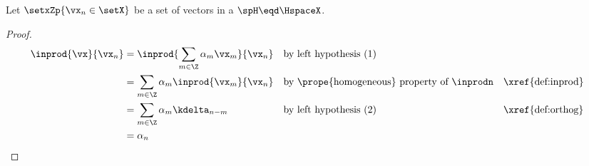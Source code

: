 \begin{lemma}
\label{lem:Hfex}
Let $\setxZp{\vx_n\in\setX}$ be a set of vectors in a   $\spH\eqd\HspaceX$.
\end{lemma}
\begin{proof}
  \begin{align*}
    \inprod{\vx}{\vx_n}
      &= \inprod{\sum_{m\in\Z} \alpha_m \vx_m}{\vx_n}
      && \text{by left hypothesis (1)}
    \\&= \sum_{m\in\Z} \alpha_m \inprod{\vx_m}{\vx_n}
      && \text{by \prope{homogeneous} property of $\inprodn$}
      && \text{\xref{def:inprod}}
    \\&= \sum_{m\in\Z} \alpha_m \kdelta_{n-m}
      && \text{by left hypothesis (2)}
      && \text{\xref{def:orthog}}
    \\&= \alpha_n
  \end{align*}
\end{proof}

